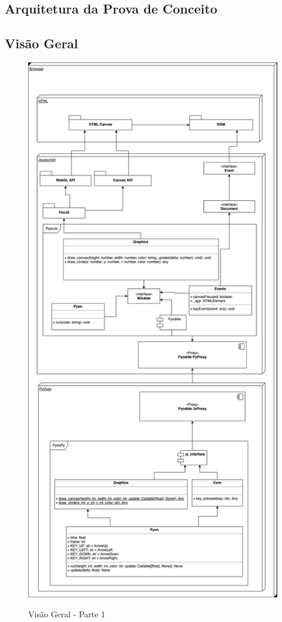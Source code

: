 \begin{apendicesenv}
\chapter[Arquitetura da Prova de Conceito]{Arquitetura da Prova de Conceito}
\label{apendice:arquitetura_poc}

\section{Visão Geral}

\begin{figure}[!h]
    \centering
    \caption{Visão Geral - Parte 1}
    \includegraphics[trim={0 23cm 0 0},clip,keepaspectratio=true,scale=0.8]{figuras/Arquitetura.eps}
    \label{fig:arquitetura_poc_p1}
\end{figure}


\end{apendicesenv}
